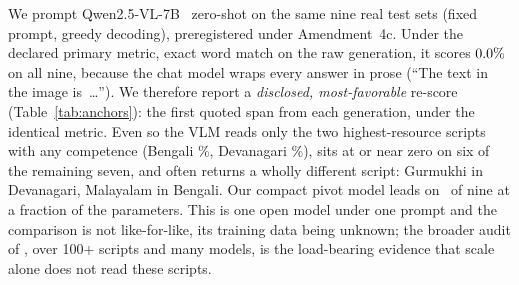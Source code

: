 We prompt Qwen2.5-VL-7B~\cite{qwen25vl} zero-shot on the same nine real test sets (fixed prompt,
greedy decoding), preregistered under Amendment~4c. Under the declared primary metric, exact
word match on the raw generation, it scores $0.0\%$ on all nine, because the chat
model wraps every answer in prose (``The text in the image is~\dots''). We therefore report a
\emph{disclosed, most-favorable} re-score (Table~\ref{tab:anchors}): the first quoted span from
each generation, under the identical metric. Even so the VLM reads only the two highest-resource
scripts with any competence (Bengali \vlmWrrBengali\%, Devanagari \vlmWrrDevanagari\%), sits at or
near zero on six of the remaining seven, and often returns a wholly different script: Gurmukhi
in Devanagari, Malayalam in Bengali. Our compact pivot model leads on \vlmScriptsWon\ of nine at a
fraction of the parameters. This is one open model under one prompt and the comparison is not
like-for-like, its training data being unknown; the broader audit of \cite{glotocr}, over 100+
scripts and many models, is the load-bearing evidence that scale alone does not read these scripts.

